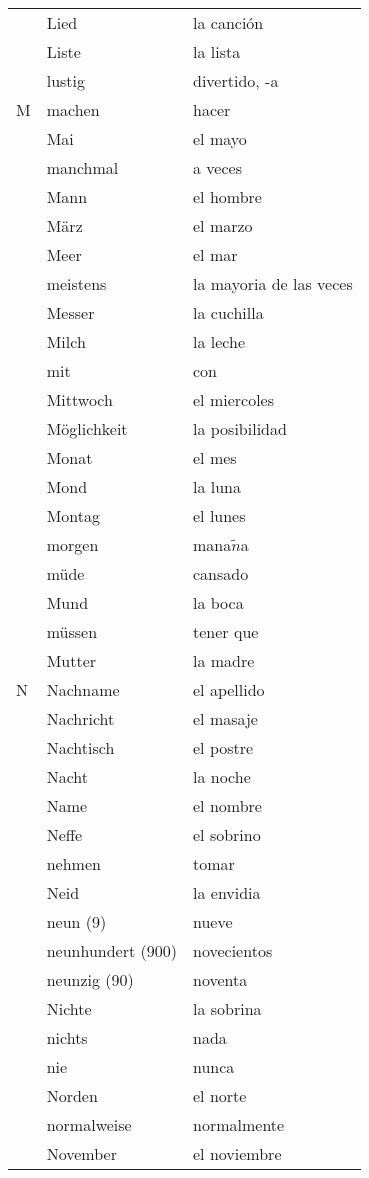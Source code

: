 \documentclass[10pt,spanish]{article}
\begin{document}
\begin{longtable}{p{} p{} | p{}}
& Lied & la canción \\
& Liste & la lista \\
& lustig & divertido, -a\\
M & machen & hacer  \\
& Mai & el mayo  \\
& manchmal & a veces  \\
& Mann & el hombre  \\
& März & el marzo  \\
& Meer & el mar  \\
& meistens & la mayoria de las veces  \\
& Messer & la cuchilla  \\
& Milch & la leche  \\
& mit & con  \\
& Mittwoch & el miercoles  \\
& Möglichkeit & la posibilidad  \\
& Monat & el mes  \\
& Mond & la luna  \\
& Montag & el lunes  \\
& morgen & mana$\tilde{n}$a \\
& müde & cansado  \\
& Mund & la boca  \\
& müssen & tener que \\
& Mutter & la madre  \\
N & Nachname & el apellido  \\
& Nachricht & el masaje  \\
& Nachtisch & el postre  \\
& Nacht & la noche  \\
& Name & el nombre  \\
& Neffe & el sobrino  \\
& nehmen & tomar  \\
& Neid & la envidia \\
& neun (9) & nueve  \\
& neunhundert (900) & novecientos  \\
& neunzig (90) & noventa  \\
& Nichte & la sobrina  \\
& nichts & nada \\
& nie & nunca  \\
& Norden & el norte  \\
& normalweise & normalmente \\
& November & el noviembre  \\

\end{longtable}
\end{document}
